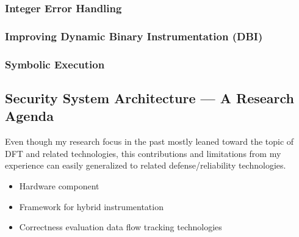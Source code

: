 \documentclass[letterpaper, 10pt]{article}
\begin{document}
\begin{small}
\subsubsection*{Integer Error Handling}

\subsubsection*{Improving Dynamic Binary Instrumentation (DBI)}

\subsubsection*{Symbolic Execution}


\subsection*{Security System Architecture ---  A Research Agenda}
Even though my research focus in the past mostly leaned toward the topic of DFT
and related technologies, this contributions and limitations from my experience
can easily generalized to related defense/reliability technologies.

\begin{itemize}
  \item Hardware component
  \item Framework for hybrid instrumentation
  \item Correctness evaluation data flow tracking technologies
\end{itemize}


\end{small}
\end{document}
